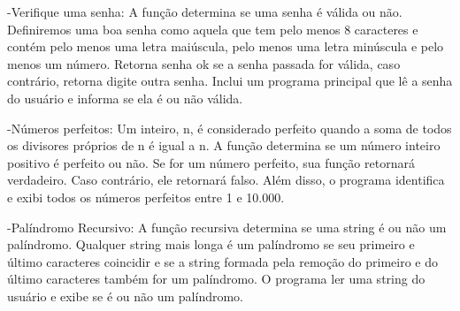-Verifique uma senha: A função determina se uma senha é válida ou não. Definiremos uma boa senha como aquela que tem pelo menos 8 caracteres e contém pelo menos uma letra maiúscula, pelo menos uma letra minúscula e pelo menos um número. Retorna senha ok se a senha passada for válida, caso contrário, retorna digite outra senha. Inclui um programa principal que lê a senha do usuário e informa se ela é ou não válida.

-Números perfeitos: Um inteiro, n, é considerado perfeito quando a soma de todos os divisores próprios de n é igual a n. A função determina se um número inteiro positivo é perfeito ou não. Se for um número perfeito, sua função retornará verdadeiro. Caso contrário, ele retornará falso. Além disso, o programa identifica e exibi todos os números perfeitos entre 1 e 10.000.

-Palíndromo Recursivo: A função recursiva determina se uma string é ou não um palíndromo. Qualquer string mais longa é um palíndromo se seu primeiro e último caracteres coincidir e se a string formada pela remoção do primeiro e do último caracteres também for um palíndromo.
O programa ler uma string do usuário e exibe se é ou não um palíndromo.



